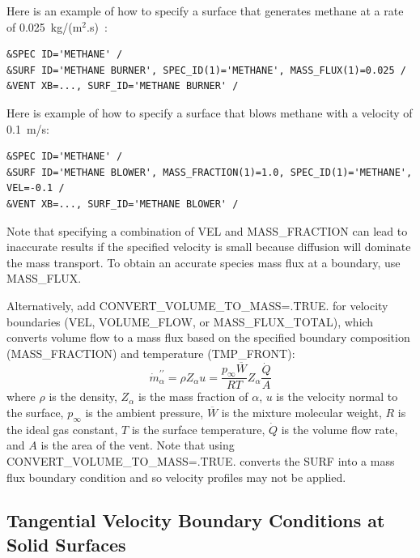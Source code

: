 \documentclass[11pt]{book}
\begin{document}
Here is an example of how to specify a surface that generates methane at a rate of 0.025~\si{kg/(m$^2$.s)}:
\begin{lstlisting}
&SPEC ID='METHANE' /
&SURF ID='METHANE BURNER', SPEC_ID(1)='METHANE', MASS_FLUX(1)=0.025 /
&VENT XB=..., SURF_ID='METHANE BURNER' /
\end{lstlisting}
Here is example of how to specify a surface that blows methane with a velocity of 0.1~m/s:
\begin{lstlisting}
&SPEC ID='METHANE' /
&SURF ID='METHANE BLOWER', MASS_FRACTION(1)=1.0, SPEC_ID(1)='METHANE', VEL=-0.1 /
&VENT XB=..., SURF_ID='METHANE BLOWER' /
\end{lstlisting}
Note that specifying a combination of {\ct VEL} and {\ct MASS\_FRACTION} can lead to inaccurate results if the specified velocity is small because diffusion will dominate the mass transport.  To obtain an accurate species mass flux at a boundary, use {\ct MASS\_FLUX}.

Alternatively, add {\ct CONVERT\_VOLUME\_TO\_MASS=.TRUE.} for velocity boundaries ({\ct VEL}, {\ct VOLUME\_FLOW}, or {\ct MASS\_FLUX\_TOTAL}), which converts volume flow to a mass flux based on the specified boundary composition ({\ct MASS\_FRACTION}) and temperature ({\ct TMP\_FRONT}):
\begin{equation}
\dot{m}_\alpha^{\prime\prime} = \rho Z_\alpha u = \frac{p_\infty \overline{W}}{R T} Z_\alpha \frac{\dot{Q}}{A}
\end{equation}
where $\rho$ is the density, $Z_\alpha$ is the mass fraction of $\alpha$, $u$ is the velocity normal to the surface, $p_\infty$ is the ambient pressure, $\overline{W}$ is the mixture molecular weight, $R$ is the ideal gas constant, $T$ is the surface temperature, $\dot{Q}$ is the volume flow rate, and $A$ is the area of the vent.  Note that using {\ct CONVERT\_VOLUME\_TO\_MASS=.TRUE.} converts the {\ct SURF} into a mass flux boundary condition and so velocity profiles may not be applied.

\subsection{Tangential Velocity Boundary Conditions at Solid Surfaces}
\label{info:WALL_MODEL}
\end{document}
